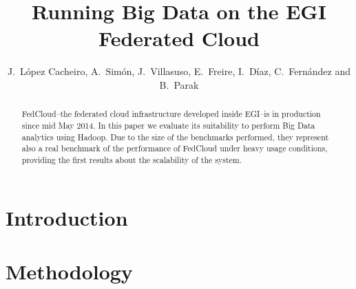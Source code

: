 \documentclass[oribibl]{llncs_Ibergrid2013}
\begin{document}
%
\frontmatter          %
%
\pagestyle{headings}  %
%
\mainmatter              %
%
\title{Running Big Data on the EGI Federated Cloud}
%
%
\author{J.~L\'opez Cacheiro, A.~Sim\'on, J.~Villasuso, E.~Freire, I.~D\'iaz, C.~Fern\'andez and B.~Parak}
%
%
%




\maketitle              %

\begin{abstract}
FedCloud--the federated cloud infrastructure developed inside EGI--is in production since mid May 2014. In this paper we evaluate its suitability to perform Big Data analytics using Hadoop. Due to the size of the benchmarks performed, they represent also a real benchmark of the performance of FedCloud under heavy usage conditions, providing the first results about the scalability of the system.


\end{abstract}

%
\section{Introduction}
\label{sect-introduction}


\section{Methodology}
\label{sect-methodology}

\end{document}
